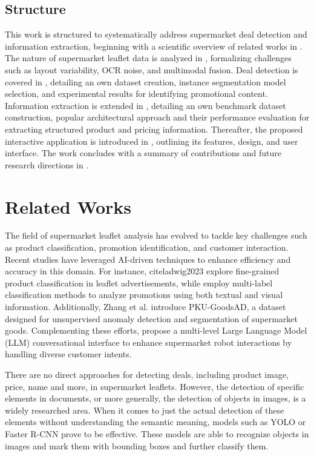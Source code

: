 \documentclass[11pt]{article}
\begin{document}
\subsection{Structure}
This work is structured to systematically address supermarket deal detection and information extraction, beginning with a scientific overview of related works in . The nature of supermarket leaflet data is analyzed in , formalizing challenges such as layout variability, OCR noise, and multimodal fusion. Deal detection is covered in , detailing an own dataset creation, instance segmentation model selection, and experimental results for identifying promotional content. Information extraction is extended in , detailing an own benchmark dataset construction, popular architectural approach and their performance evaluation for extracting structured product and pricing information. Thereafter, the proposed interactive application is introduced in , outlining its features, design, and user interface. The work concludes with a summary of contributions and future research directions in .


\section{Related Works}
\label{sec:related_works}

The field of supermarket leaflet analysis has evolved to tackle key challenges such as product classification, promotion identification, and customer interaction. Recent studies have leveraged AI-driven techniques to enhance efficiency and accuracy in this domain. For instance, cite{ladwig2023} explore fine-grained product classification in leaflet advertisements, while \cite{arroyo2020} employ multi-label classification methods to analyze promotions using both textual and visual information. Additionally, Zhang et al. \cite{zhang2024} introduce PKU-GoodsAD, a dataset designed for unsupervised anomaly detection and segmentation of supermarket goods. Complementing these efforts,\cite{nandkumar2024} propose a multi-level Large Language Model (LLM) conversational interface to enhance supermarket robot interactions by handling diverse customer intents.

There are no direct approaches for detecting deals, including product image, price, name and more, in supermarket leaflets. However, the detection of specific elements in documents, or more generally, the detection of objects in images, is a widely researched area. When it comes to just the actual detection of these elements without understanding the semantic meaning, models such as YOLO or Faster R-CNN prove to be effective. These models are able to recognize objects in images and mark them with bounding boxes and further classify them. 
\end{document}
